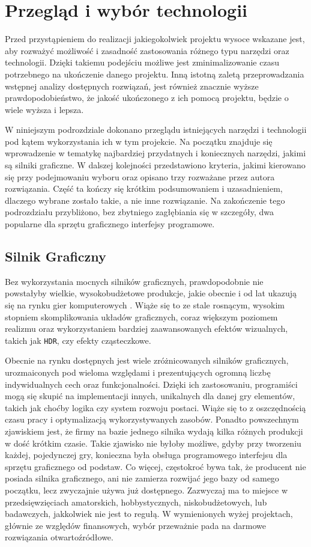 \documentclass[11pt]{mwrep}
\begin{document}
  \section{Przegląd i wybór technologii}


    Przed przystąpieniem do realizacji jakiegokolwiek projektu wysoce wskazane jest, aby rozważyć możliwość i zasadność zastosowania różnego typu narzędzi oraz technologii. Dzięki takiemu podejściu możliwe jest zminimalizowanie czasu potrzebnego na ukończenie danego projektu. Inną istotną zaletą przeprowadzania wstępnej analizy dostępnych rozwiązań, jest również znacznie wyższe prawdopodobieństwo, że jakość ukończonego z ich pomocą projektu, będzie o wiele wyższa i lepsza.

    W niniejszym podrozdziale dokonano przeglądu istniejących narzędzi i technologii pod kątem wykorzystania ich w tym projekcie. Na początku znajduje się wprowadzenie w tematykę najbardziej przydatnych i koniecznych narzędzi, jakimi są silniki graficzne. W dalszej kolejności przedstawiono kryteria, jakimi kierowano się przy podejmowaniu wyboru oraz opisano trzy rozważane przez autora rozwiązania. Część ta kończy się krótkim podsumowaniem i uzasadnieniem, dlaczego wybrane zostało takie, a nie inne rozwiązanie. Na zakończenie tego podrozdziału przybliżono, bez zbytniego zagłębiania się w szczegóły, dwa popularne dla sprzętu graficznego interfejsy programowe.


    \subsection{Silnik Graficzny}

    Bez wykorzystania mocnych silników graficznych, prawdopodobnie nie powstałyby wielkie, wy\-so\-ko\-bud\-że\-to\-we produkcje, jakie obecnie i od lat ukazują się na rynku gier komputerowych . Wiąże się to ze stale rosnącym, wysokim stopniem skomplikowania układów graficznych, coraz większym poziomem realizmu oraz wykorzystaniem bardziej zaawansowanych efektów wizualnych, takich jak \texttt{HDR}, czy efekty cząsteczkowe.

    Obecnie na rynku dostępnych jest wiele zróżnicowanych silników graficznych, urozmaiconych pod wieloma względami i prezentujących ogromną liczbę indywidualnych cech oraz funkcjonalności. Dzięki ich zastosowaniu, programiści mogą się skupić na implementacji innych, unikalnych dla danej gry elementów, takich jak choćby logika czy system rozwoju postaci. Wiąże się to z oszczędnością czasu pracy i optymalizacją wykorzystywanych zasobów. Ponadto powszechnym zjawiskiem jest, że firmy na bazie jednego silnika wydają kilka różnych produkcji w dość krótkim czasie. Takie zjawisko nie byłoby możliwe, gdyby przy tworzeniu każdej, pojedynczej gry, konieczna była obsługa programowego interfejsu dla sprzętu graficznego od podstaw. Co więcej, częstokroć bywa tak, że producent nie posiada silnika graficznego, ani nie zamierza rozwijać jego bazy od samego początku, lecz zwyczajnie używa już dostępnego. Zazwyczaj ma to miejsce w przedsięwzięciach amatorskich, hobbystycznych, niskobudżetowych, lub badawczych, jakkolwiek nie jest to regułą. W wymienionych wyżej projektach, głównie ze względów finansowych, wybór przeważnie pada na darmowe rozwiązania otwartoźródłowe.
\end{document}
